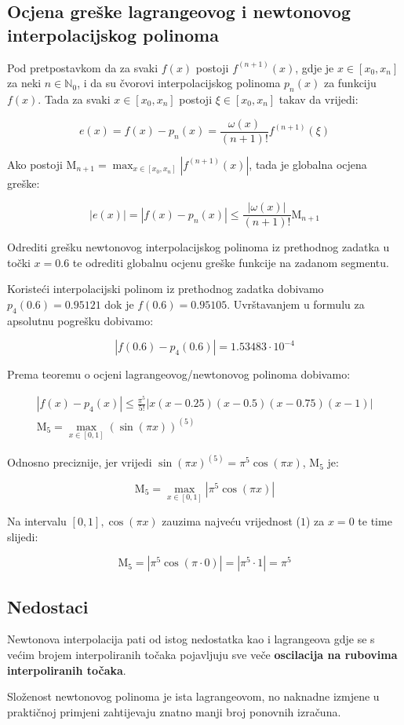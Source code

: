 \newpage

\subsection{Ocjena greške lagrangeovog i newtonovog interpolacijskog polinoma}

Pod pretpostavkom da za svaki $f(x)$ postoji $f^{(n+1)}(x)$, gdje je $x \in [x_0,x_n]$ za neki $n\in\mathbb{N}_0$, i da su čvorovi interpolacijskog polinoma $p_n(x)$ za funkciju $f(x)$. Tada za svaki $x\in[x_0,x_n]$ postoji $\xi\in[x_0,x_n]$ takav da vrijedi:

$$
e(x) = f(x) - p_n(x) = \frac{\omega(x)}{(n + 1)!}f^{(n+1)}(\xi)
$$

Ako postoji $\mathrm{M}_{n+1} = \max_{x\in[x_0,x_n]}\left|f^{(n+1)}(x)\right|$, tada je globalna ocjena greške:

$$
|e(x)| = |f(x) - p_n(x)| \leq \frac{|\omega(x)|}{(n+1)!}\mathrm{M}_{n+1}
$$

\begin{examplebox}
    Odrediti grešku newtonovog interpolacijskog polinoma iz prethodnog zadatka u točki $x=0.6$ te odrediti globalnu ocjenu greške funkcije na zadanom segmentu.
\end{examplebox}

Koristeći interpolacijski polinom iz prethodnog zadatka dobivamo $p_4(0.6) = 0.95121$ dok je $f(0.6) = 0.95105$. Uvrštavanjem u formulu za apsolutnu pogrešku dobivamo:

$$
|f(0.6)-p_4(0.6)| = 1.53483\cdot10^{-4}
$$

Prema teoremu o ocjeni lagrangeovog/newtonovog polinoma dobivamo:

\begin{gather}
|f(x)-p_4(x)| \leq \frac{\pi^5}{5!}|x(x-0.25)(x-0.5)(x-0.75)(x-1)|\\
\mathrm{M}_5=\max_{x\in[0,1]}(\sin(\pi x))^{(5)}
\end{gather}

Odnosno preciznije, jer vrijedi $\sin(\pi x)^{(5)} = \pi^5\cos(\pi x)$, $\mathrm{M}_5$ je:

$$
\mathrm{M}_5 = \max_{x\in[0,1]}\left|\pi^5\cos(\pi x)\right|
$$

Na intervalu $[0,1], \cos(\pi x)$ zauzima najveću vrijednost ($1$) za $x=0$ te time slijedi:

$$
\mathrm{M}_5 = \left|\pi^5\cos(\pi \cdot 0)\right| = \left|\pi^5\cdot1\right| = \pi^5
$$

\subsection{Nedostaci}

Newtonova interpolacija pati od istog nedostatka kao i lagrangeova gdje se s većim brojem interpoliranih točaka pojavljuju sve veče \textbf{oscilacija na rubovima interpoliranih točaka}.

Složenost newtonovog polinoma je ista lagrangeovom, no naknadne izmjene u praktičnoj primjeni zahtijevaju znatno manji broj ponovnih izračuna.
